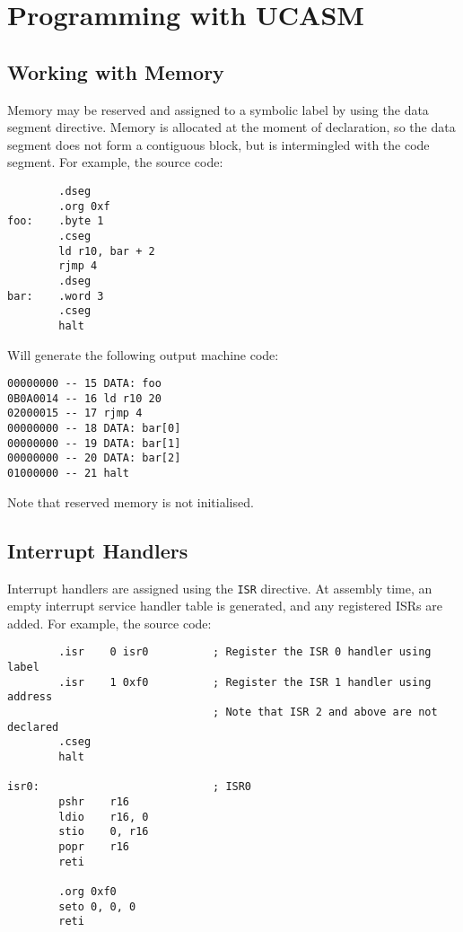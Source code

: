 \documentclass[12pt,twoside]{report}
\begin{document}
\chapter{Programming with UCASM}

\section{Working with Memory}

Memory may be reserved and assigned to a symbolic label by using the
data segment directive. Memory is allocated at the moment of
declaration, so the data segment does not form a contiguous block, but
is intermingled with the code segment. For example, the source code:

\begin{verbatim}
        .dseg
        .org 0xf
foo:    .byte 1
        .cseg
        ld r10, bar + 2
        rjmp 4
        .dseg
bar:    .word 3
        .cseg
        halt
\end{verbatim}

\noindent
Will generate the following output machine code:

\begin{verbatim}
00000000 -- 15 DATA: foo
0B0A0014 -- 16 ld r10 20
02000015 -- 17 rjmp 4
00000000 -- 18 DATA: bar[0]
00000000 -- 19 DATA: bar[1]
00000000 -- 20 DATA: bar[2]
01000000 -- 21 halt
\end{verbatim}

\noindent
Note that reserved memory is not initialised.

\newpage
\section{Interrupt Handlers}

Interrupt handlers are assigned using the \texttt{ISR} directive. At
assembly time, an empty interrupt service handler table is generated,
and any registered ISRs are added. For example, the source code:

\begin{verbatim}
        .isr    0 isr0          ; Register the ISR 0 handler using label
        .isr    1 0xf0          ; Register the ISR 1 handler using address
                                ; Note that ISR 2 and above are not declared
        .cseg
        halt

isr0:                           ; ISR0
        pshr    r16
        ldio    r16, 0
        stio    0, r16
        popr    r16
        reti

        .org 0xf0
        seto 0, 0, 0
        reti
\end{verbatim}
\end{document}

